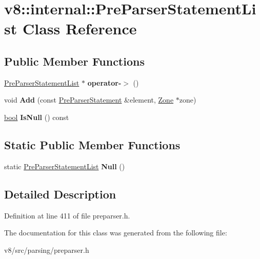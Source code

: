\hypertarget{classv8_1_1internal_1_1PreParserStatementList}{}\section{v8\+:\+:internal\+:\+:Pre\+Parser\+Statement\+List Class Reference}
\label{classv8_1_1internal_1_1PreParserStatementList}
\subsection*{Public Member Functions}
\begin{DoxyCompactItemize}
\item 
\mbox{\label{classv8_1_1internal_1_1PreParserStatementList_af6c533693ed67339eb2b5d7ee93ce9a0}} 
\mbox{\hyperlink{classv8_1_1internal_1_1PreParserStatementList}{Pre\+Parser\+Statement\+List}} $\ast$ {\bfseries operator-\/$>$} ()
\item 
\mbox{\label{classv8_1_1internal_1_1PreParserStatementList_a2413773be3fdc483aac38d43116388c9}} 
void {\bfseries Add} (const \mbox{\hyperlink{classv8_1_1internal_1_1PreParserStatement}{Pre\+Parser\+Statement}} \&element, \mbox{\hyperlink{classv8_1_1internal_1_1Zone}{Zone}} $\ast$zone)
\item 
\mbox{\label{classv8_1_1internal_1_1PreParserStatementList_a2fcc8c47dd43486acbeaea01995ace40}} 
\mbox{\hyperlink{classbool}{bool}} {\bfseries Is\+Null} () const
\end{DoxyCompactItemize}
\subsection*{Static Public Member Functions}
\begin{DoxyCompactItemize}
\item 
\mbox{\label{classv8_1_1internal_1_1PreParserStatementList_ab2215d60d54d8dd47f6a3bc0a7f65a31}} 
static \mbox{\hyperlink{classv8_1_1internal_1_1PreParserStatementList}{Pre\+Parser\+Statement\+List}} {\bfseries Null} ()
\end{DoxyCompactItemize}


\subsection{Detailed Description}


Definition at line 411 of file preparser.\+h.



The documentation for this class was generated from the following file\+:\begin{DoxyCompactItemize}
\item 
v8/src/parsing/preparser.\+h\end{DoxyCompactItemize}
